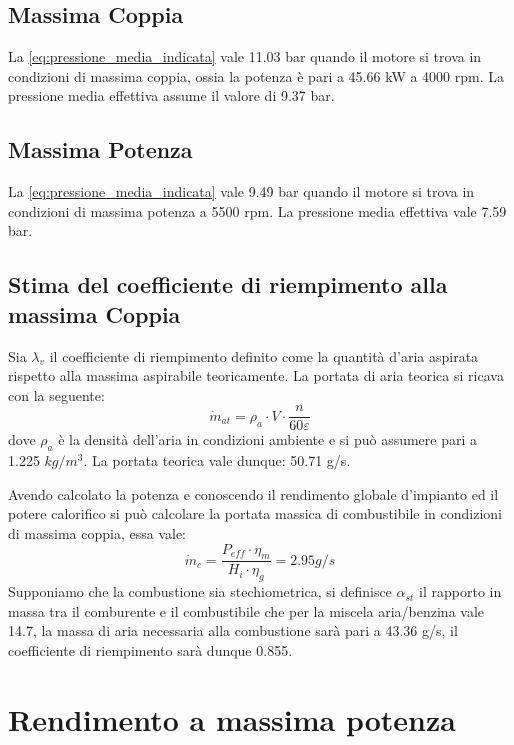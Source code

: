 \documentclass[a4paper,12pt]{article}
\begin{document}
\subsection{Massima Coppia}
La \eqref{eq:pressione_media_indicata} vale 11.03 bar quando il motore si trova in condizioni di massima coppia, ossia la potenza è pari a 45.66 kW a 4000 rpm.
La pressione media effettiva assume il valore di 9.37 bar.
\subsection{Massima Potenza}
La \eqref{eq:pressione_media_indicata} vale 9.49 bar quando il motore si trova in condizioni di massima potenza a 5500 rpm.
La pressione media effettiva vale 7.59 bar.

\subsection{Stima del coefficiente di riempimento alla massima Coppia}
Sia $\lambda_v$ il coefficiente di riempimento definito come la quantità d'aria aspirata rispetto alla massima aspirabile teoricamente.
La portata di aria teorica si ricava con la seguente:
\begin{equation}
    \dot m_{at} = \rho_a \cdot V \cdot \frac{n}{60\varepsilon}
\end{equation}
dove $\rho_a$ è la densità dell'aria in condizioni ambiente e si può assumere pari a 1.225 $kg/m^3$.
La portata teorica vale dunque: 50.71 g/s.

Avendo calcolato la potenza e conoscendo il rendimento globale d'impianto ed il potere calorifico si può calcolare la portata massica di combustibile in condizioni di massima
coppia, essa vale: 
\begin{equation}
    \dot m_c = \frac{P_{eff}\cdot \eta_m}{H_i\cdot \eta_g} = 2.95 g/s
\end{equation}
Supponiamo che la combustione sia stechiometrica, si definisce $\alpha_{st}$ il rapporto in massa tra il comburente e il combustibile che per la miscela aria/benzina
vale 14.7, la massa di aria necessaria alla combustione sarà pari a 43.36 g/s, il coefficiente di riempimento sarà dunque 0.855.

\section{Rendimento a massima potenza}
\end{document}
